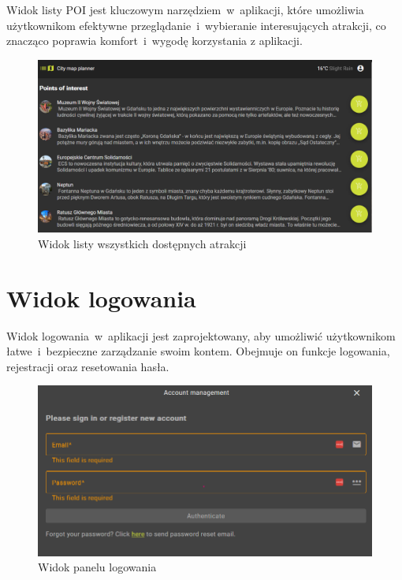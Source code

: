 Widok listy POI jest kluczowym narzędziem~w~aplikacji, które umożliwia użytkownikom
efektywne przeglądanie~i~wybieranie interesujących atrakcji, co znacząco poprawia komfort~i~wygodę korzystania z aplikacji.
\begin{figure}[H]
    \centering
    \includegraphics[width=1\textwidth]{attachments/poilist}
    \caption{Widok listy wszystkich dostępnych atrakcji}
    \label{fig:poilist}
\end{figure}

\section{Widok logowania}
\label{sec:logowanie}

Widok logowania~w~aplikacji jest zaprojektowany, aby umożliwić użytkownikom łatwe~i~bezpieczne
zarządzanie swoim kontem. Obejmuje on funkcje logowania, rejestracji oraz resetowania hasła.

\begin{figure}[H]
    \centering
    \includegraphics[width=1\textwidth]{attachments/logowanie}
    \caption{Widok panelu logowania}
    \label{fig:logowanie}
\end{figure}

